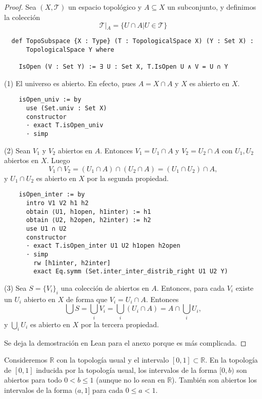 \begin{proof}
  Sea $(X, \mathcal{T})$ un espacio topológico y $A \subseteq X$ un subconjunto, y definimos la colección
  $$
  \mathcal{T}|_A = \{U \cap A | U \in \mathcal{T}\}
  $$

  \begin{lstlisting}
  def TopoSubspace {X : Type} (T : TopologicalSpace X) (Y : Set X) :
      TopologicalSpace Y where

    IsOpen (V : Set Y) := ∃ U : Set X, T.IsOpen U ∧ V = U ∩ Y \end{lstlisting}
  
  (1) El universo es abierto. En efecto, pues $A = X \cap A$ y $X$ es abierto en $X$.
  
  \begin{lstlisting}
    isOpen_univ := by
      use (Set.univ : Set X)
      constructor
      · exact T.isOpen_univ
      · simp \end{lstlisting}
  
  (2) Sean $V_1$ y $V_2$ abiertos en $A$. Entonces $V_1 = U_1 \cap A$ y $V_2 = U_2 \cap A$ con $U_1, U_2$ abiertos en $X$. Luego
  $$
  V_1 \cap V_2 = (U_1 \cap A) \cap (U_2 \cap A) = (U_1 \cap U_2) \cap A,
  $$
  y $U_1 \cap U_2$ es abierto en $X$ por la segunda propiedad.

  \begin{lstlisting}
    isOpen_inter := by
      intro V1 V2 h1 h2
      obtain ⟨U1, h1open, h1inter⟩ := h1
      obtain ⟨U2, h2open, h2inter⟩ := h2
      use U1 ∩ U2
      constructor
      · exact T.isOpen_inter U1 U2 h1open h2open
      · simp
        rw [h1inter, h2inter]
        exact Eq.symm (Set.inter_inter_distrib_right U1 U2 Y) \end{lstlisting}
  
  (3) Sea $S = \{V_i\}_i$ una colección de abiertos en $A$. Entonces, para cada $V_i$ existe un $U_i$ abierto en $X$ de forma que $V_i = U_i \cap A$. Entonces
  $$
  \bigcup S = \bigcup_{i}V_i = \bigcup_{i}(U_i \cap A) = A \cap \bigcup_{i}U_i,
  $$
  y $\bigcup_{i}U_i$ es abierto en $X$ por la tercera propiedad.

  Se deja la demostración en Lean para el anexo porque es más complicada.
\end{proof}

\begin{example}
  Consideremos $\mathbb{R}$ con la topología usual y el intervalo $[0, 1] \subset \mathbb{R}$. En la topología de $[0, 1]$ inducida por la topología usual, los intervalos de la forma $[0, b)$ son abiertos para todo $0 < b \leq 1$ (aunque no lo sean en $\mathbb{R}$). También son abiertos los intervalos de la forma $(a, 1]$ para cada $0 \leq a < 1$.
\end{example}

